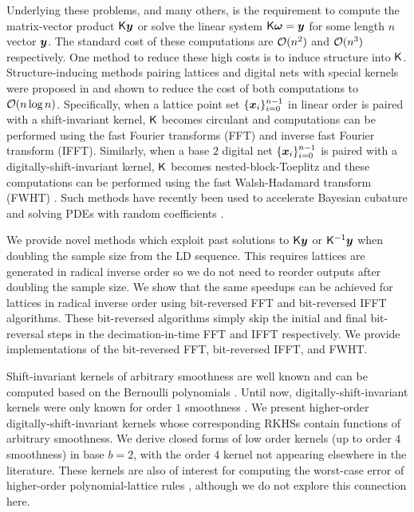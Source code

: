 \documentclass[acmsmall]{acmart}
\newcommand{\FJHNote}[1]{\textcolor{blue}{#1}}
\begin{document}
Underlying these problems, and many others, is the requirement to compute the matrix-vector product ${\mathsf{K}} {\boldsymbol{y}}$ or solve the linear system ${\mathsf{K}} \boldsymbol{\omega} ={\boldsymbol{y}}$ for some length $n$ vector ${\boldsymbol{y}}$.
The standard cost of these computations are ${\mathcal{O}}(n^2)$ and ${\mathcal{O}}(n^3)$ respectively. One method to reduce these high costs is to induce structure into ${\mathsf{K}}$. Structure-inducing methods pairing lattices and digital nets with special kernels were proposed in \citep{zeng.spline_lattice_digital_net,zeng.spline_lattice_error_analysis} and shown to reduce the cost of both computations to ${\mathcal{O}}(n \log n)$. Specifically, when a lattice point set $\{{\boldsymbol{x}}_i\}_{i=0}^{n-1}$ in linear order is paired with a shift-invariant kernel, ${\mathsf{K}}$ becomes circulant and computations can be performed using the fast Fourier transforms (FFT) and inverse fast Fourier transform (IFFT). Similarly, when a base $2$ digital net $\{{\boldsymbol{x}}_i\}_{i=0}^{n-1}$ is paired with a digitally-shift-invariant kernel, ${\mathsf{K}}$ becomes nested-block-Toeplitz and these computations can be performed using the fast Walsh-Hadamard transform (FWHT) \citep{fino.fwht}. Such methods have recently been used to accelerate Bayesian cubature \citep{rathinavel.bayesian_QMC_lattice,rathinavel.bayesian_QMC_sobol,rathinavel.bayesian_QMC_thesis} and solving PDEs with random coefficients \citep{kaarnioja.kernel_interpolants_lattice_rkhs,kaarnioja.kernel_interpolants_lattice_rkhs_serendipitous,sorokin.gp4darcy}.

We provide novel methods which exploit past solutions to ${\mathsf{K}}{\boldsymbol{y}}$ or ${\mathsf{K}}^{-1}{\boldsymbol{y}}$ when doubling the sample size from the LD sequence. This requires lattices are generated in radical inverse order so we do not need to reorder outputs after doubling the sample size. We show that the same speedups can be achieved for lattices in radical inverse order using bit-reversed FFT and bit-reversed IFFT algorithms. These bit-reversed algorithms simply skip the initial and final bit-reversal steps in the decimation-in-time FFT and IFFT respectively. We provide implementations of the bit-reversed FFT, bit-reversed IFFT, and FWHT. 

Shift-invariant kernels of arbitrary smoothness are well known and can be computed based on the Bernoulli polynomials \citep{kaarnioja.kernel_interpolants_lattice_rkhs,kaarnioja.kernel_interpolants_lattice_rkhs_serendipitous,cools2021fast,cools2020lattice,sloan2001tractability,kuo2004lattice}. Until now, digitally-shift-invariant kernels were only known for order $1$ smoothness \citep{dick.multivariate_integraion_sobolev_spaces_digital_nets}. We present higher-order digitally-shift-invariant kernels whose corresponding RKHSs contain functions of arbitrary smoothness. We derive closed forms of low order kernels (up to order $4$ smoothness) in base $b=2$, with the order $4$ kernel not appearing elsewhere in the literature. These kernels are also of interest for computing the worst-case error of higher-order polynomial-lattice rules \cite{baldeaux.polylat_efficient_comp_worse_case_error_cbc}, although we do not explore this connection here. 
\end{document}
